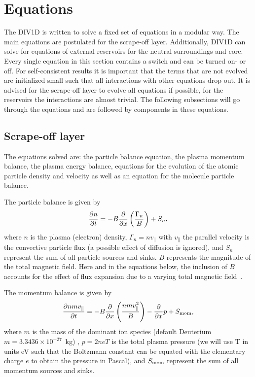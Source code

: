 \documentclass[amsmath,amssymb,a4]{revtex4-2}
\begin{document}
\section{Equations}\label{basic_equations}
The DIV1D is written to solve a fixed set of equations in a modular way. The main equations are postulated for the scrape-off layer. Additionally, DIV1D can solve for equations of external reservoirs for the neutral surroundings and core. Every single equation in this section contains a switch and can be turned on- or off. For self-consistent results it is important that the terms that are not evolved are initialized small such that all interactions with other equations drop out. It is advised for the scrape-off layer to evolve all equations if possible, for the reservoirs the interactions are almost trivial. The following subsections will go through the equations and are followed by components in these equations.

\subsection{Scrape-off layer}
The equations solved are: the particle balance equation, the plasma momentum balance, the plasma energy balance, equations for the evolution of the atomic particle density and velocity as well as an equation for the molecule particle balance.

\noindent The particle balance is given by
\begin{equation}\label{particle_balance}
    {\partial n \over \partial t} = - B{\partial \over \partial x} \left({\Gamma_n \over B}\right) + S_n,
\end{equation}
where $n$ is the plasma (electron) density, $\Gamma_n = n v_\parallel$ with $v_\parallel$ the parallel velocity is the convective particle flux (a possible effect of diffusion is ignored), and $S_n$ represent the sum of all particle sources and sinks. $B$ represents the magnitude of the total magnetic field. Here and in the equations below, the inclusion of $B$ accounts for the effect of flux expansion due to a varying total magnetic field~\cite{dudson2019,havlickova2013}.

\noindent The momentum balance is given by
\begin{equation}\label{momentum_balance}
    {\partial n m v_\parallel \over \partial t} = - B{\partial \over \partial x} \left({n m v_\parallel^2 \over B}\right) - {\partial \over \partial x} p + S_{\rm mom},
\end{equation}
where $m$ is the mass of the dominant ion species (default Deuterium $m = 3.3436 \times 10^{-27}$~kg) , $p = 2 n e T$ is the total plasma pressure (we will use T in units eV such that the Boltzmann constant can be equated with the elementary charge $e$ to obtain the pressure in Pascal), and $S_{\rm mom}$ represent the sum of all momentum sources and sinks.
\end{document}
